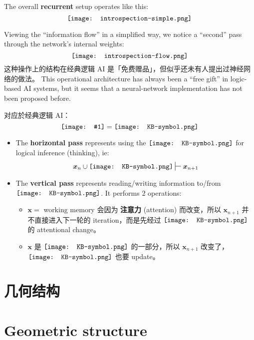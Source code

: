\documentclass[orivec]{llncs}
\newcommand{\vect}[1]{\boldsymbol{#1}}
\newcommand*\KB{\vcenter{\hbox{\texttt{[image: KB-symbol.png]}}}}
\newcommand*\NewSym[1]{\vcenter{\hbox{\texttt{[image: \#1]}}}}
\begin{document}
The overall \textbf{recurrent} setup operates like this:
\begin{equation}
\vcenter{\hbox{\texttt{[image: introspection-simple.png]}}}
\end{equation}

Viewing the ``information flow'' in a simplified way, we notice a ``second'' pass through the network's internal weights:
\begin{equation}
\vcenter{\hbox{\texttt{[image: introspection-flow.png]}}}
\end{equation}
\ifdefined\chinchin
这种操作上的结构在经典逻辑 AI 是「免费赠品」，但似乎还未有人提出过神经网络的做法。
\else
This operational architecture has always been a ``free gift'' in logic-based AI systems, but it seems that a neural-network implementation has not been proposed before.
\fi

对应於经典逻辑 AI：
\begin{equation}
\NewSym{IRNN.png} = \KB 
\end{equation}
\begin{itemize}
	\item The \textbf{horizontal pass} represents using the $\KB$ for logical inference (thinking), ie:
	\begin{equation}
	\vect{x}_n  \cup \KB \sststile{}{} \vect{x}_{n+1}
	\end{equation}

	\item The \textbf{vertical pass} represents reading/writing information to/from $\KB$.  It performs 2 operations:

	\begin{itemize}
		\item $\vect{x} = $ working memory 会因为 \textbf{注意力} (attention) 而改变，所以 $\vect{x}_{n+1}$ 并不直接进入下一轮的 iteration，而是先经过 $\KB$ 的 attentional change。

		\item $\vect{x}$ 是 $\KB$ 的一部分，所以 $\vect{x}_{n+1}$ 改变了，$\KB$ 也要 update。
	\end{itemize}

\end{itemize}

\ifdefined\chinchin
\section{几何结构}
\else
\section{Geometric structure}
\fi
\end{document}
